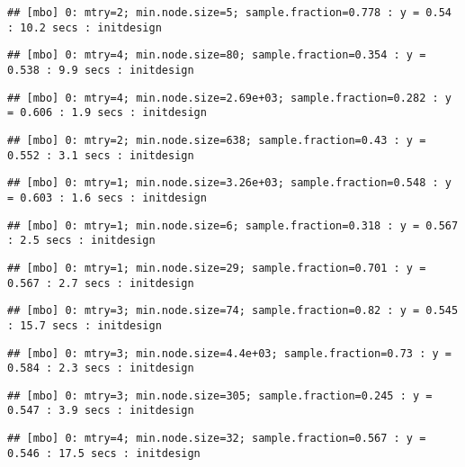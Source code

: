 \documentclass[
]{article}
\begin{document}
\begin{verbatim}
## [mbo] 0: mtry=2; min.node.size=5; sample.fraction=0.778 : y = 0.54 : 10.2 secs : initdesign
\end{verbatim}

\begin{verbatim}
## [mbo] 0: mtry=4; min.node.size=80; sample.fraction=0.354 : y = 0.538 : 9.9 secs : initdesign
\end{verbatim}

\begin{verbatim}
## [mbo] 0: mtry=4; min.node.size=2.69e+03; sample.fraction=0.282 : y = 0.606 : 1.9 secs : initdesign
\end{verbatim}

\begin{verbatim}
## [mbo] 0: mtry=2; min.node.size=638; sample.fraction=0.43 : y = 0.552 : 3.1 secs : initdesign
\end{verbatim}

\begin{verbatim}
## [mbo] 0: mtry=1; min.node.size=3.26e+03; sample.fraction=0.548 : y = 0.603 : 1.6 secs : initdesign
\end{verbatim}

\begin{verbatim}
## [mbo] 0: mtry=1; min.node.size=6; sample.fraction=0.318 : y = 0.567 : 2.5 secs : initdesign
\end{verbatim}

\begin{verbatim}
## [mbo] 0: mtry=1; min.node.size=29; sample.fraction=0.701 : y = 0.567 : 2.7 secs : initdesign
\end{verbatim}

\begin{verbatim}
## [mbo] 0: mtry=3; min.node.size=74; sample.fraction=0.82 : y = 0.545 : 15.7 secs : initdesign
\end{verbatim}

\begin{verbatim}
## [mbo] 0: mtry=3; min.node.size=4.4e+03; sample.fraction=0.73 : y = 0.584 : 2.3 secs : initdesign
\end{verbatim}

\begin{verbatim}
## [mbo] 0: mtry=3; min.node.size=305; sample.fraction=0.245 : y = 0.547 : 3.9 secs : initdesign
\end{verbatim}

\begin{verbatim}
## [mbo] 0: mtry=4; min.node.size=32; sample.fraction=0.567 : y = 0.546 : 17.5 secs : initdesign
\end{verbatim}
\end{document}
